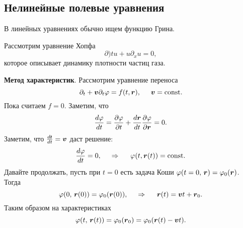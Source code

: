 \subsection*{Нелинейные полевые уравнения}

В линейных уравнениях обычно ищем функцию Грина.

Рассмотрим уравнение Хопфа
\begin{equation*}
    \partial)t u + u \partial_x u = 0,
\end{equation*}
которое описывает динамику плотности частиц газа.

\textbf{Метод характеристик}. 
Рассмотрим уравнение переноса
\begin{equation*}
    \partial_t  + \mbox{\boldmath $v$} \partial_t \varphi = f(t, \mbox{\boldmath $r$}), 
    \hspace{5 mm} 
    \mbox{\boldmath $v$} = \textnormal{const}.
\end{equation*}
Пока считаем $f = 0$. Заметим, что
\begin{equation*}
    \frac{d \varphi}{d t} = \frac{\partial \varphi}{\partial t}  + \frac{d \mbox{\boldmath $r$}}{d t} \frac{\partial \varphi}{\partial \mbox{\boldmath $r$}} = 0.
\end{equation*}
Заметим, что $\frac{d \smallvc{t}}{d t} = \vc{v}$ даст решение:
\begin{equation*}
    \frac{d \varphi}{d t} =0,
    \hspace{0.5cm} \Rightarrow \hspace{0.5cm}   
    \varphi(t, \mbox{\boldmath $r$}(t)) = \textnormal{const}.
\end{equation*}
Давайте продолжать, пусть при $t=0$ есть задача Коши $\varphi(t=0,\, \mbox{\boldmath $r$}) = \varphi_0(\mbox{\boldmath $r$})$. Тогда
\begin{equation*}
    \varphi(0,\, \mbox{\boldmath $r$}(0)) = \varphi_0 (\mbox{\boldmath $r$}(0)),
    \hspace{0.5cm} \Rightarrow \hspace{0.5cm}
    \mbox{\boldmath $r$}(t) = \mbox{\boldmath $v$} t + \mbox{\boldmath $r$}_0.
\end{equation*}
Таким образом на характеристиках
\begin{equation*}
    \varphi(t,\, \mbox{\boldmath $r$}(t)) = \varphi_0 (\mbox{\boldmath $r$}_0) = \varphi_0(\mbox{\boldmath $r$}(t)-\mbox{\boldmath $v$} t).
\end{equation*}
% 



